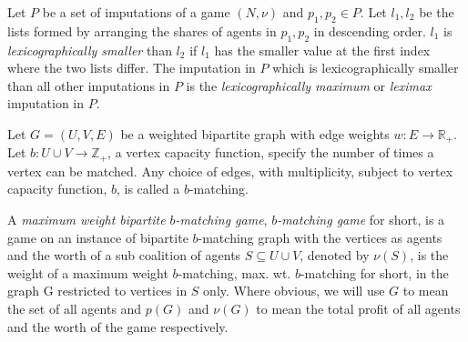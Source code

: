 \begin{definition}
Let $P$ be a set of imputations of a game $(N,\nu)$ and $p_1,p_2 \in P$. Let $l_1,l_2$ be the lists formed by arranging the shares of agents in $p_1,p_2$ in descending order. $l_1$ is {\em lexicographically smaller} than $l_2$ if $l_1$ has the smaller value at the first index where the two lists differ. The imputation in $P$ which is lexicographically smaller than all other imputations in $P$ is the {\em lexicographically maximum} or {\em leximax} imputation in $P$.  
\end{definition}

Let $G = (U,V,E)$ be a weighted bipartite graph with edge weights $w: E \rightarrow \mathbb{R}_+$. Let $b: U\cup V \rightarrow \mathbb{Z}_+$, a vertex capacity function, specify the number of times a vertex can be matched. Any choice of edges, with multiplicity, subject to vertex capacity function, $b$, is called a $b$-matching. 

A \textit{maximum weight bipartite $b$-matching game}, \textit{$b$-matching game} for short, is a game on an instance of bipartite $b$-matching graph with the vertices as agents and the worth of a sub coalition of agents $S\subseteq U\cup V$, denoted by $\nu(S)$, is the weight of a maximum weight $b$-matching, max. wt. $b$-matching for short, in the graph G restricted to vertices in $S$ only. Where obvious, we will use $G$ to mean the set of all agents and $p(G)$ and $\nu(G)$ to mean the total profit of all agents and the worth of the game respectively.







